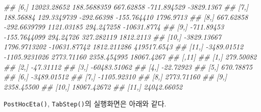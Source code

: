\documentclass[
  11pt,
  krantz2, a4paper, twoside]{krantz}
\newenvironment{Shaded}{\begin{snugshade}}{\end{snugshade}}
\newcommand{\CommentTok}[1]{\textcolor[rgb]{0.56,0.35,0.01}{\textit{#1}}}
\newcommand{\DataTypeTok}[1]{\textcolor[rgb]{0.13,0.29,0.53}{#1}}
\newcommand{\KeywordTok}[1]{\textcolor[rgb]{0.13,0.29,0.53}{\textbf{#1}}}
\newcommand{\NormalTok}[1]{#1}
\theoremstyle{definition}
\theoremstyle{definition}
\theoremstyle{definition}
\theoremstyle{remark}
\begin{document}
\begin{Shaded}
\begin{Highlighting}[]
\CommentTok{\#\#  [6,] 12023.28652   188.5688359    667.62858  {-}711.894529  {-}3829.1367}
\CommentTok{\#\#  [7,]   188.56884   129.3349739   {-}292.66398  {-}155.764410   1796.9713}
\CommentTok{\#\#  [8,]   667.62858  {-}292.6639799   1121.03185   294.247258 {-}10631.8774}
\CommentTok{\#\#  [9,]  {-}711.89453  {-}155.7644099    294.24726   327.282119   1812.2113}
\CommentTok{\#\# [10,] {-}3829.13667  1796.9713202 {-}10631.87742  1812.211286 419517.6543}
\CommentTok{\#\# [11,] {-}3489.01512 {-}1105.9231026   2773.71160  2358.454995  18067.4267}
\CommentTok{\#\#              [,11]}
\CommentTok{\#\#  [1,]    279.50082}
\CommentTok{\#\#  [2,]    {-}47.31112}
\CommentTok{\#\#  [3,] {-}60483.51062}
\CommentTok{\#\#  [4,]    {-}22.72923}
\CommentTok{\#\#  [5,]    670.78875}
\CommentTok{\#\#  [6,]  {-}3489.01512}
\CommentTok{\#\#  [7,]  {-}1105.92310}
\CommentTok{\#\#  [8,]   2773.71160}
\CommentTok{\#\#  [9,]   2358.45500}
\CommentTok{\#\# [10,]  18067.42672}
\CommentTok{\#\# [11,]  24042.66052}
\end{Highlighting}
\end{Shaded}

\normalsize

\texttt{PostHocEta()}, \texttt{TabStep()}의 실행화면은 아래와 같다.


\begin{Shaded}
\end{Shaded}
\end{document}

